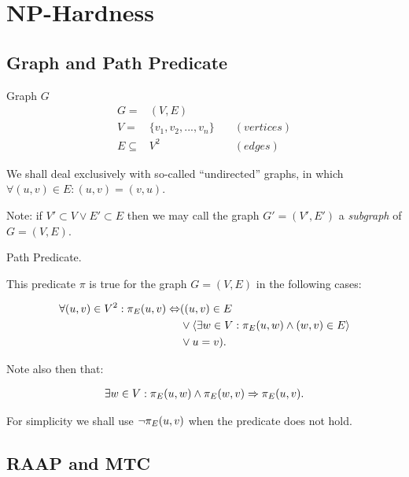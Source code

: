 \chapter{NP-Hardness}
\label{chapHardness}

\section{Graph and Path Predicate}

\begin{definition}
Graph $G$
\begin{align}
	\nonumber G = & (V,E) \\
	\nonumber V = & \{v_1, v_2, ..., v_n\} \quad & (vertices)\\
	\nonumber E \subseteq & V^2 & (edges)
\end{align}

We shall deal exclusively with so-called ``undirected'' graphs, in which $\forall (u,v) \in E : (u,v) = (v,u)$.

Note: if $V' \subset V \vee E' \subset E$ then we may call the graph $G'=(V',E')$ a \emph{subgraph} of $G=(V,E)$.
\end{definition}

\begin{definition}
Path Predicate.

This predicate $\pi$ is true for the graph $G=(V,E)$ in the following cases:

\begin{align}
	\nonumber \forall (u,v) \in V^2 : \pi_{E}(u, v) \Leftrightarrow & ( (u, v) \in E \\
	\nonumber & \vee \langle \exists w \in V : \pi_{E}(u, w) \wedge (w, v) \in E \rangle \\
	\nonumber & \vee u = v ).
\end{align}

Note also then that:

\begin{align}
	\nonumber \exists w \in V : \pi_{E}(u, w) \wedge \pi_{E}(w, v) \Rightarrow \pi_{E}(u, v).
\end{align}

For simplicity we shall use $\neg\pi_{E}(u, v)$ when the predicate does not hold.

\end{definition}

\section{RAAP and MTC}


